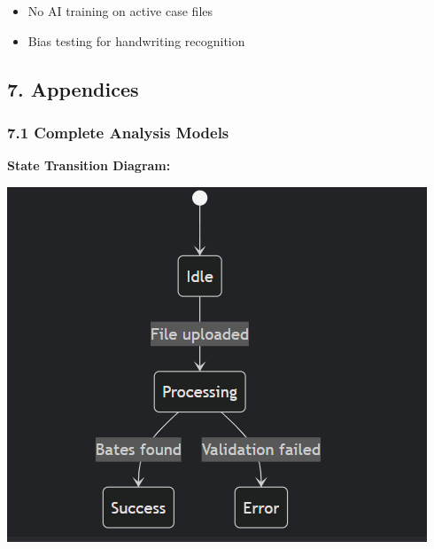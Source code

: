 \documentclass[
]{article}
\providecommand{\tightlist}{%
  \setlength{\itemsep}{0pt}\setlength{\parskip}{0pt}}
\begin{document}
\begin{itemize}
\tightlist
\item
  No AI training on active case files
\item
  Bias testing for handwriting recognition
\end{itemize}

\hypertarget{appendices}{%
\subsection{\texorpdfstring{\textbf{7.
Appendices}}{7. Appendices}}\label{appendices}}

\hypertarget{complete-analysis-models}{%
\subsubsection{\texorpdfstring{\textbf{7.1 Complete Analysis
Models}}{7.1 Complete Analysis Models}}\label{complete-analysis-models}}

\textbf{State Transition Diagram:}

\includegraphics[width=4.93819in,height=4.16725in]{image4.png}
\end{document}
